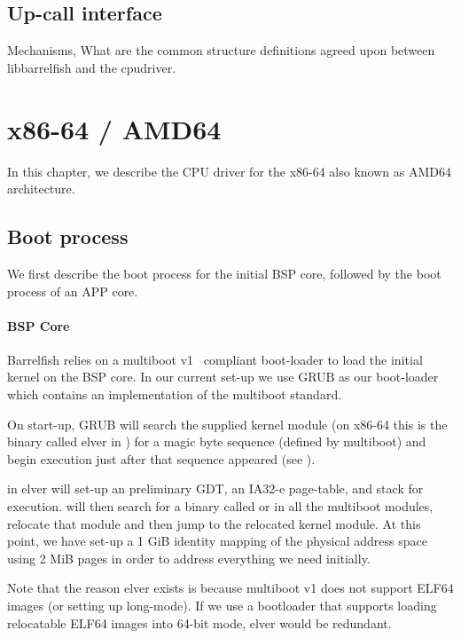 \documentclass[a4paper,11pt,twoside]{report}
\begin{document}
{{\section{Up-call interface}
Mechanisms, What are the common structure definitions agreed upon between
libbarrelfish and the cpudriver.

\chapter{x86-64 / AMD64}
\label{chap:x86}

In this chapter, we describe the CPU driver for the x86-64 also known as AMD64
architecture.

\section{Boot process}

We first describe the boot process for the initial BSP core, followed by
the boot process of an APP core.

\subsubsection{BSP Core}

Barrelfish relies on a multiboot v1~\cite{multiboot1} compliant boot-loader to
load the initial kernel on the BSP core. In our current set-up we use GRUB as
our boot-loader which contains an implementation of the multiboot standard.

On start-up, GRUB will search the supplied kernel module (on x86-64 this is the
binary called elver in ) for a magic byte sequence
(defined by multiboot) and begin execution just after that sequence appeared
(see ).

 in elver will set-up an preliminary GDT, an IA32-e page-table,
and stack for execution.  will then search for a
binary called  or  in all the multiboot
modules, relocate that module and then jump to the relocated kernel module. At
this point, we have set-up a 1 GiB identity mapping of the physical address
space using 2 MiB  pages in order to address everything we need initially.

Note that the reason elver exists is because multiboot v1 does not support
ELF64 images (or setting up long-mode). If we use a bootloader that supports
loading relocatable ELF64 images into 64-bit mode, elver would be redundant.

}}
\end{document}
